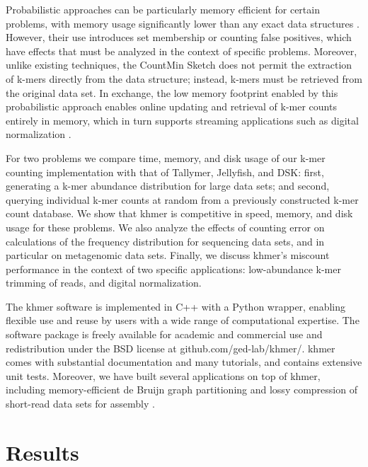 \documentclass{article}
\begin{document}
Probabilistic approaches can be particularly memory efficient for
certain problems, with memory usage significantly lower than any exact
data structures \cite{Pell2012}.  However, their use introduces set
membership or counting false positives, which have effects that must
be analyzed in the context of specific problems.  Moreover, unlike
existing techniques, the CountMin Sketch does not permit the
extraction of k-mers directly from the data structure; instead,
k-mers must be retrieved from the original data set.  In exchange,
the low memory footprint enabled by this probabilistic approach enables
online updating and retrieval of k-mer counts entirely in memory, which
in turn supports streaming applications such as digital normalization
\cite{Brown2012}.


For two problems we compare time, memory, and disk usage of our k-mer counting
implementation with that of Tallymer, Jellyfish, and DSK: first, generating a k-mer abundance distribution for large
data sets; and second, querying individual k-mer counts at random from
a previously constructed k-mer count database.  We show that khmer
is competitive in speed, memory, and disk usage for these
problems.  We also analyze the effects of counting error on
calculations of the frequency distribution for sequencing data sets,
and in particular on metagenomic data sets.  Finally, we discuss
khmer's miscount performance in the context of two specific applications:
low-abundance k-mer trimming of reads, and digital normalization.


The khmer software is implemented in C++ with a Python wrapper,
enabling flexible use and reuse by users with a wide range of
computational
expertise.  The software package is freely available for academic and
commercial use and redistribution under the BSD license at
github.com/ged-lab/khmer/.  khmer comes with substantial documentation
and many tutorials, and contains extensive unit tests.  Moreover, we
have built several applications on top of khmer, including
memory-efficient de Bruijn graph partitioning \cite{Pell2012} and
lossy compression of short-read data sets for assembly
\cite{Brown2012}.

\section{Results}
\end{document}
